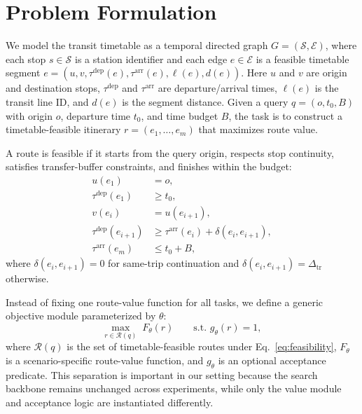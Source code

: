 \section{Problem Formulation}
We model the transit timetable as a temporal directed graph
\cite{pereira2022gtfs2gps,wessel2017retrospective,wong2013leveraginggtfs}
\(G=(\mathcal{S},\mathcal{E})\), where each stop \(s \in \mathcal{S}\) is a station
identifier and each edge \(e \in \mathcal{E}\) is a feasible timetable segment
\(e=(u,v,\tau^{\mathrm{dep}}(e),\tau^{\mathrm{arr}}(e),\ell(e),d(e))\).
Here \(u\) and \(v\) are origin and destination stops,
\(\tau^{\mathrm{dep}}\) and \(\tau^{\mathrm{arr}}\) are departure/arrival times,
\(\ell(e)\) is the transit line ID, and \(d(e)\) is the segment distance.
Given a query \(q=(o,t_0,B)\) with origin \(o\), departure time \(t_0\), and
time budget \(B\), the task is to construct a timetable-feasible itinerary
\(r=(e_1,\ldots,e_m)\) that maximizes route value.

A route is feasible if it starts from the query origin, respects stop continuity,
satisfies transfer-buffer constraints, and finishes within the budget:
\begin{equation}
    \label{eq:feasibility}
    \begin{aligned}
        u(e_1)                   & = o,                                                \\
        \tau^{\mathrm{dep}}(e_1) & \ge t_0,                                            \\
        v(e_i)                   & = u(e_{i+1}),                                       \\
        \tau^{\mathrm{dep}}(e_{i+1})
                                 & \ge \tau^{\mathrm{arr}}(e_i) + \delta(e_i,e_{i+1}), \\
        \tau^{\mathrm{arr}}(e_m) & \le t_0 + B,
    \end{aligned}
\end{equation}
where \(\delta(e_i,e_{i+1})=0\) for same-trip continuation and
\(\delta(e_i,e_{i+1})=\Delta_{\mathrm{tr}}\) otherwise.

Instead of fixing one route-value function for all tasks, we define a generic
objective module parameterized by \(\theta\):
\begin{equation}
    \label{eq:generic_objective}
    \max_{r \in \mathcal{R}(q)} \; F_{\theta}(r)
    \qquad
    \text{s.t. }
    g_{\theta}(r)=1,
\end{equation}
where \(\mathcal{R}(q)\) is the set of timetable-feasible routes under
Eq.~\ref{eq:feasibility}, \(F_{\theta}\) is a scenario-specific route-value
function, and \(g_{\theta}\) is an optional acceptance predicate. This
separation is important in our setting because the search backbone remains
unchanged across experiments, while only the value module and acceptance logic
are instantiated differently.


